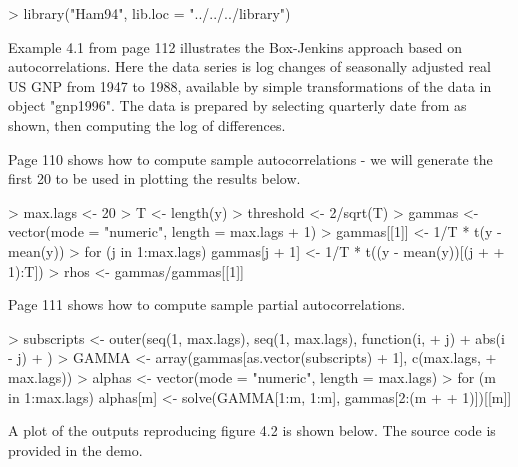 \begin{Schunk}
\begin{Sinput}
> library("Ham94", lib.loc = "../../../library")
\end{Sinput}
\end{Schunk}
Example 4.1 from page 112 illustrates the Box-Jenkins
approach based on autocorrelations.  Here the data series is log changes
of seasonally adjusted real US GNP from 1947 to 1988,
available by simple transformations of the data in object "gnp1996".
The data is prepared by selecting quarterly date from as shown, then computing the log of differences.
\begin{Schunk}
\end{Schunk}
Page 110 shows how to compute sample autocorrelations - we will generate the first 20 to be used in plotting the results below.
\begin{Schunk}
\begin{Sinput}
> max.lags <- 20
> T <- length(y)
> threshold <- 2/sqrt(T)
> gammas <- vector(mode = "numeric", length = max.lags + 1)
> gammas[[1]] <- 1/T * t(y - mean(y)) %
> for (j in 1:max.lags) gammas[j + 1] <- 1/T * t((y - mean(y))[(j + 
+     1):T]) %
> rhos <- gammas/gammas[[1]]
\end{Sinput}
\end{Schunk}
Page 111 shows how to compute sample partial autocorrelations.  
\begin{Schunk}
\begin{Sinput}
> subscripts <- outer(seq(1, max.lags), seq(1, max.lags), function(i, 
+     j) {
+     abs(i - j)
+ })
> GAMMA <- array(gammas[as.vector(subscripts) + 1], c(max.lags, 
+     max.lags))
> alphas <- vector(mode = "numeric", length = max.lags)
> for (m in 1:max.lags) alphas[m] <- solve(GAMMA[1:m, 1:m], gammas[2:(m + 
+     1)])[[m]]
\end{Sinput}
\end{Schunk}
A plot of the outputs reproducing figure 4.2 is shown below.  The source code is provided in the demo.
